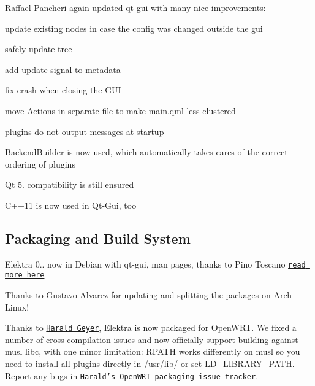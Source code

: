 Raffael Pancheri again updated qt-\/gui with many nice improvements\+:


\begin{DoxyItemize}
\item update existing nodes in case the config was changed outside the gui
\item safely update tree
\item add update signal to metadata
\item fix crash when closing the G\+U\+I
\item move Actions in separate file to make main.\+qml less clustered
\item plugins do not output messages at startup
\item {\ttfamily Backend\+Builder} is now used, which automatically takes cares of the correct ordering of plugins
\item Qt 5. compatibility is still ensured
\item C++11 is now used in Qt-\/\+Gui, too
\end{DoxyItemize}

\subsection*{Packaging and Build System}

Elektra 0.. now in Debian with qt-\/gui, man pages, thanks to Pino Toscano \href{https://packages.qa.debian.org/e/elektra/news/20151215T000031Z.html}{\tt read more here}

Thanks to Gustavo Alvarez for updating and splitting the packages on Arch Linux!

Thanks to \href{http://friends.ccbib.org/harald/supporting/}{\tt Harald Geyer}, Elektra is now packaged for Open\+W\+R\+T. We fixed a number of cross-\/compilation issues and now officially support building against musl libc, with one minor limitation\+: R\+P\+A\+T\+H works differently on musl so you need to install all plugins directly in /usr/lib/ or set L\+D\+\_\+\+L\+I\+B\+R\+A\+R\+Y\+\_\+\+P\+A\+T\+H. Report any bugs in \href{https://github.com/haraldg/packages}{\tt Harald's Open\+W\+R\+T packaging issue tracker}.


